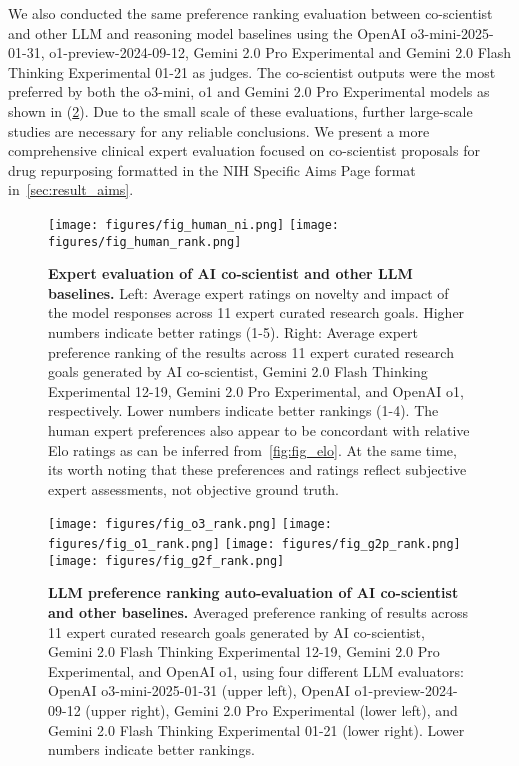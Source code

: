 We also conducted the same preference ranking evaluation between co-scientist and other LLM and reasoning model baselines using the OpenAI o3-mini-2025-01-31, o1-preview-2024-09-12, Gemini 2.0 Pro Experimental and Gemini 2.0 Flash Thinking Experimental 01-21 as judges. The co-scientist outputs were the most preferred by both the o3-mini, o1 and Gemini 2.0 Pro Experimental models as shown in (\cref{fig:fig_llm_rank}). Due to the small scale of these evaluations, further large-scale studies are necessary for any reliable conclusions. We present a more comprehensive clinical expert evaluation focused on co-scientist proposals for drug repurposing formatted in the NIH Specific Aims Page format in~\cref{sec:result_aims}. 
\begin{figure}[htbp!]
\centering
\texttt{[image: figures/fig\_human\_ni.png]}
\texttt{[image: figures/fig\_human\_rank.png]}
\vspace{0.1cm}
\caption{\textbf{Expert evaluation of AI co-scientist and other LLM baselines.} Left: Average expert ratings on novelty and impact of the model responses across 11 expert curated research goals. Higher numbers indicate better ratings (1-5). Right: Average expert preference ranking of the results across 11 expert curated research goals generated by AI co-scientist, Gemini 2.0 Flash Thinking Experimental 12-19, Gemini 2.0 Pro Experimental, and OpenAI o1, respectively. Lower numbers indicate better rankings (1-4). The human expert preferences also appear to be concordant with relative Elo ratings as can be inferred from~\cref{fig:fig_elo}. At the same time, its worth noting that these preferences and ratings reflect subjective expert assessments, not objective ground truth.}
\label{fig:fig_human}
\end{figure}

\begin{figure}[ht!]
\centering
\texttt{[image: figures/fig\_o3\_rank.png]}
\texttt{[image: figures/fig\_o1\_rank.png]}
\texttt{[image: figures/fig\_g2p\_rank.png]}
\texttt{[image: figures/fig\_g2f\_rank.png]}
\vspace{0.1cm}
\caption{\textbf{LLM preference ranking auto-evaluation of AI co-scientist and other baselines.} Averaged preference ranking of results across 11 expert curated research goals generated by AI co-scientist, Gemini 2.0 Flash Thinking Experimental 12-19, Gemini 2.0 Pro Experimental, and OpenAI o1, using four different LLM evaluators: OpenAI o3-mini-2025-01-31 (upper left), OpenAI o1-preview-2024-09-12 (upper right), Gemini 2.0 Pro Experimental (lower left), and Gemini 2.0 Flash Thinking Experimental 01-21 (lower right). Lower numbers indicate better rankings.}
\label{fig:fig_llm_rank}
\end{figure}



